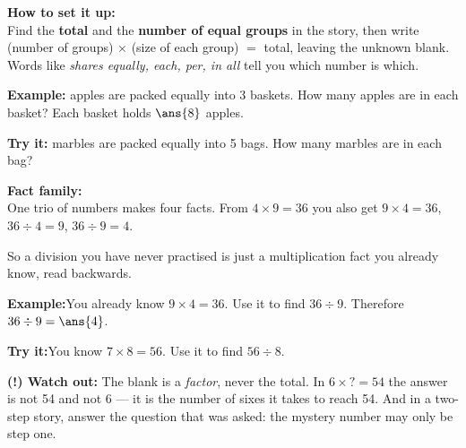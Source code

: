 \documentclass[12pt]{article}
\begin{document}
\begin{formulabox}\textbf{How to set it up:}\\[4pt]
Find the \textbf{total} and the \textbf{number of equal groups} in the story, then write
(number of groups) $\times$ (size of each group) $=$ total, leaving the unknown blank.
Words like \emph{shares equally, each, per, in all} tell you which number is which.
\end{formulabox}
\begin{examplebox}\textbf{Example:} apples are packed equally into 3 baskets.
How many apples are in each basket?
Each basket holds $\ans{8}$ apples.
\end{examplebox}
\begin{tryitbox}\textbf{Try it:} marbles are packed equally into 5 bags.
How many marbles are in each bag?\\[2pt]
\end{tryitbox}

\begin{formulabox}\textbf{Fact family:}\\[4pt]
One trio of numbers makes four facts. From $4 \times 9 = 36$ you also get
$9 \times 4 = 36$, \; $36 \div 4 = 9$, \; $36 \div 9 = 4$.\par
So a division you have never practised is just a multiplication fact you already know, read backwards.
\end{formulabox}
\begin{examplebox}\textbf{Example:}\quad You already know $9 \times 4 = 36$. Use it to find $36 \div 9$.
Therefore $36 \div 9 = \ans{4}$.
\end{examplebox}
\begin{tryitbox}\textbf{Try it:}\quad You know $7 \times 8 = 56$. Use it to find $56 \div 8$.\\[2pt]
\end{tryitbox}

\begin{watchoutbox}\textbf{(!) Watch out:} The blank is a \emph{factor}, never the total. In
$6 \times ? = 54$ the answer is not 54 and not 6 --- it is the number of sixes it takes to reach 54.
And in a two-step story, answer the question that was asked: the mystery number may only be step one.
\end{watchoutbox}
\end{document}
